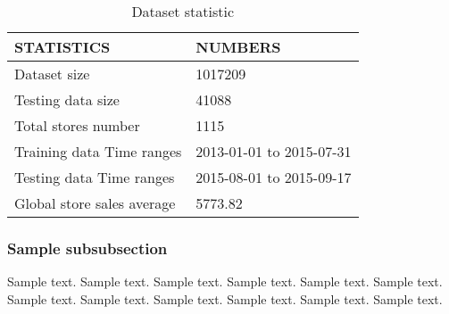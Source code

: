 \documentclass[jou,apacite]{apa6}
\begin{document}
  \begin{table}
  \caption{Dataset statistic} 
  \begin{tabular}{|l|l|}
  \hline
  STATISTICS & NUMBERS \\
  \hline
  Dataset size & 1017209 \\
  \hline
  Testing data size & 41088 \\
  \hline
  Total stores number & 1115 \\
  \hline
  Training data Time ranges & 2013-01-01 to 2015-07-31 \\
  \hline
  Testing data Time ranges & 2015-08-01 to 2015-09-17 \\
  \hline  
  Global store sales average & 5773.82 \\
  \hline
  \end{tabular}
  \end{table}
  


\subsubsection{Sample subsubsection}
Sample text. Sample text. Sample text. Sample text. Sample text. Sample text. 
Sample text. Sample text. Sample text. Sample text. Sample text. Sample text. 





\end{document}
